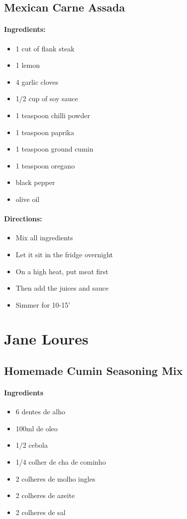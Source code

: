 \documentclass{article}
\begin{document}
\subsection{Mexican Carne Assada}

\paragraph{Ingredients:}

\begin{itemize}
	\item 1 cut of flank steak
	\item 1 lemon
	\item 4 garlic cloves
	\item 1/2 cup of soy sauce
	\item 1 teaspoon chilli powder
	\item 1 teaspoon paprika
	\item 1 teaspoon ground cumin
	\item 1 teaspoon oregano
	\item black pepper
	\item olive oil
\end{itemize}

\paragraph{Directions:}
\begin{itemize}
	\item Mix all ingredients
	\item Let it sit in the fridge overnight
	\item On a high heat, put meat first
	\item Then add the juices and sauce
	\item Simmer for 10-15'
\end{itemize}

\section{Jane Loures}

\subsection{Homemade Cumin Seasoning Mix}

\paragraph{Ingredients}
\begin{itemize}
	\item 6 dentes de alho
	\item 100ml de oleo
	\item 1/2 cebola
	\item 1/4 colher de cha de cominho
	\item 2 colheres de molho ingles
	\item 2 colheres de azeite
	\item 2 colheres de sal
\end{itemize}
\end{document}
